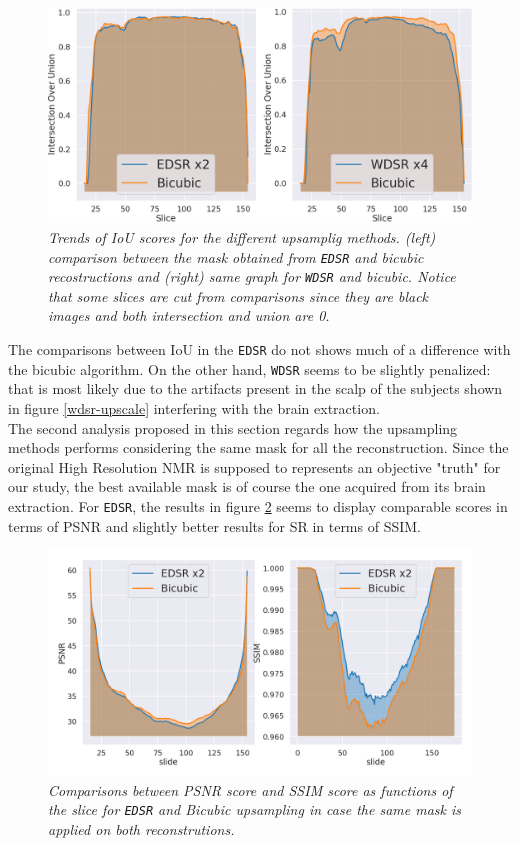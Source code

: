\documentclass[12pt,a4paper]{report}
\begin{document}
\begin{figure}[H]
 \centering
 \includegraphics[scale=0.35]{./images/iou_scores.png}
 \caption{\it Trends of IoU scores for the different upsamplig methods. (left) comparison between the mask obtained from {\tt EDSR} and bicubic recostructions and (right) same graph for {\tt WDSR} and bicubic. 
 Notice that some slices are cut from comparisons since they are black images and both intersection and union are 0.}
 \label{fig:iou}
\end{figure}

The comparisons between IoU in the {\tt EDSR} do not shows much of a difference with the bicubic algorithm. On the other hand, {\tt WDSR} seems to be slightly penalized: that is most likely due to the artifacts present in the scalp of the subjects shown
in figure \ref{wdsr-upscale} interfering with the brain extraction.
\\
The second analysis proposed in this section regards how the upsampling methods performs considering the same mask for all the reconstruction. 
Since the original High Resolution NMR is supposed to represents an objective "truth" for our study, the best available mask is of course the one acquired from its brain extraction.
For {\tt EDSR}, the results in figure \ref{fig:edsr-bet-same-mask} seems to display comparable scores in terms of PSNR and slightly better results for SR in terms of SSIM. 

\begin{figure}[H]
 \centering
 \includegraphics[scale=0.35]{./images/betted_x2_slide_same_mask.png}
 \caption{\it Comparisons between PSNR score and SSIM score as functions of the slice for {\tt EDSR} and Bicubic upsampling in case the same mask is applied on both reconstrutions.}
 \label{fig:edsr-bet-same-mask}
\end{figure}
\end{document}
